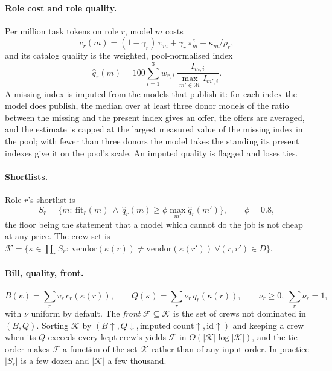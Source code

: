 \documentclass[10pt,a4paper]{article}
\newcommand{\mods}{\mathcal{M}}
\newcommand{\crews}{\mathcal{K}}
\newcommand{\front}{\mathcal{F}}
\theoremstyle{definition}
\theoremstyle{remark}
\begin{document}
\paragraph{Role cost and role quality.}
Per million task tokens on role $r$, model $m$ costs
\begin{equation}
c_r(m) = (1-\gamma_r)\,\pi_m + \gamma_r\,\pi^{c}_m + \kappa_m/\rho_r ,
\label{eq:seatcost}
\end{equation}
and its catalog quality is the weighted, pool-normalised index
\begin{equation}
\hat q_r(m) = 100 \sum_{i=1}^{3} w_{r,i}\,\frac{I_{m,i}}{\max_{m'\in\mods} I_{m',i}} .
\label{eq:catq}
\end{equation}
A missing index is imputed from the models that publish it: for each index the model does publish, the median over at least three donor models of the ratio between the missing and the present index gives an offer, the offers are averaged, and the estimate is capped at the largest measured value of the missing index in the pool; with fewer than three donors the model takes the standing its present indexes give it on the pool's scale. An imputed quality is flagged and loses ties.

\paragraph{Shortlists.}
Role $r$'s shortlist is
\begin{equation}
S_r=\{m:\ \mathrm{fit}_r(m)\ \wedge\ \hat q_r(m)\ge \phi\max_{m'} \hat q_r(m')\},\qquad \phi=0.8,
\label{eq:floor}
\end{equation}
the floor being the statement that a model which cannot do the job is not cheap at any price. The crew set is $\crews=\{\kappa\in\prod_r S_r:\ \mathrm{vendor}(\kappa(r))\ne\mathrm{vendor}(\kappa(r'))\ \forall (r,r')\in D\}$.

\paragraph{Bill, quality, front.}
\begin{equation}
B(\kappa)=\sum_{r} v_r\,c_r(\kappa(r)),\qquad Q(\kappa)=\sum_{r}\nu_r\, q_r(\kappa(r)),\qquad \nu_r\ge0,\ \textstyle\sum_r\nu_r=1,
\label{eq:crew}
\end{equation}
with $\nu$ uniform by default. The \emph{front} $\front\subseteq\crews$ is the set of crews not dominated in $(B,Q)$. Sorting $\crews$ by $(B\uparrow, Q\downarrow, \text{imputed count}\uparrow, \text{id}\uparrow)$ and keeping a crew when its $Q$ exceeds every kept crew's yields $\front$ in $O(|\crews|\log|\crews|)$, and the tie order makes $\front$ a function of the set $\crews$ rather than of any input order. In practice $|S_r|$ is a few dozen and $|\crews|$ a few thousand.
\end{document}
